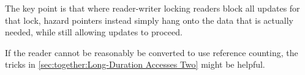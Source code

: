 The key point is that where reader-writer locking readers block all
updates for that lock, hazard pointers instead simply hang onto the
data that is actually needed, while still allowing updates to proceed.

If the reader cannot be reasonably be converted to use reference
counting, the tricks in \cref{sec:together:Long-Duration Accesses Two}
might be helpful.



